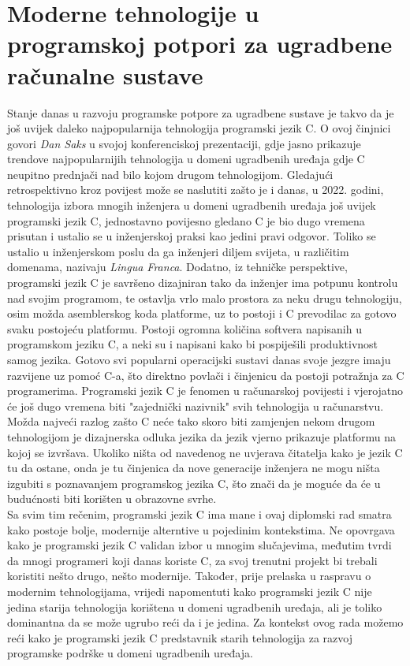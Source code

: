 \chapter{Moderne tehnologije u programskoj potpori za ugradbene računalne sustave}
Stanje danas u razvoju programske potpore za ugradbene sustave je takvo da je još uvijek daleko najpopularnija tehnologija programski jezik C. O ovoj činjnici govori \textit{Dan Saks} u svojoj konferenciskoj prezentaciji\cite{danSaksWritingBetterEmbeddedSoftware}, gdje jasno prikazuje trendove najpopularnijih tehnologija u domeni ugradbenih uređaja gdje C neupitno prednjači nad bilo kojom drugom tehnologijom. Gledajući retrospektivno kroz povijest može se naslutiti zašto je i danas, u 2022. godini, tehnologija izbora mnogih inženjera u domeni ugradbenih uređaja još uvijek programski jezik C, jednostavno povijesno gledano C je bio dugo vremena prisutan i ustalio se u inženjerskoj praksi kao jedini pravi odgovor. Toliko se ustalio u inženjerskom poslu da ga inženjeri diljem svijeta, u različitim domenama, nazivaju \textit{Lingua Franca}. Dodatno, iz tehničke perspektive, programski jezik C je savršeno dizajniran tako da inženjer ima potpunu kontrolu nad svojim programom, te ostavlja vrlo malo prostora za neku drugu tehnologiju, osim možda asemblerskog koda platforme, uz to postoji i C prevodilac za gotovo svaku postojeću platformu. Postoji ogromna količina softvera napisanih u programskom jeziku C, a neki su i napisani kako bi pospiješili produktivnost samog jezika. Gotovo svi popularni operacijski sustavi danas svoje jezgre imaju razvijene uz pomoć C-a, što direktno povlači i činjenicu da postoji potražnja za C programerima. Programski jezik C je fenomen u računarskoj povijesti i vjerojatno će još dugo vremena biti "zajednički nazivnik" svih tehnologija u računarstvu. Možda najveći razlog zašto C neće tako skoro biti zamjenjen nekom drugom tehnologijom je dizajnerska odluka jezika da jezik vjerno prikazuje platformu na kojoj se izvršava. Ukoliko ništa od navedenog ne uvjerava čitatelja kako je jezik C tu da ostane, onda je tu činjenica da nove generacije inženjera ne mogu ništa izgubiti s poznavanjem programskog jezika C, što znači da je moguće da će u budućnosti biti korišten u obrazovne svrhe. \\
Sa svim tim rečenim, programski jezik C ima mane i ovaj diplomski rad smatra kako postoje bolje, modernije alterntive u pojedinim kontekstima. Ne opovrgava kako je programski jezik C validan izbor u mnogim slučajevima, međutim tvrdi da mnogi programeri koji danas koriste C, za svoj trenutni projekt bi trebali koristiti nešto drugo, nešto modernije. Također, prije prelaska u raspravu o modernim tehnologijama, vrijedi napomentuti kako programski jezik C nije jedina starija tehnologija korištena u domeni ugradbenih uređaja, ali je toliko dominantna da se može ugrubo reći da i je jedina. Za kontekst ovog rada možemo reći kako je programski jezik C predstavnik starih tehnologija za razvoj programske podrške u domeni ugradbenih uređaja. \\
